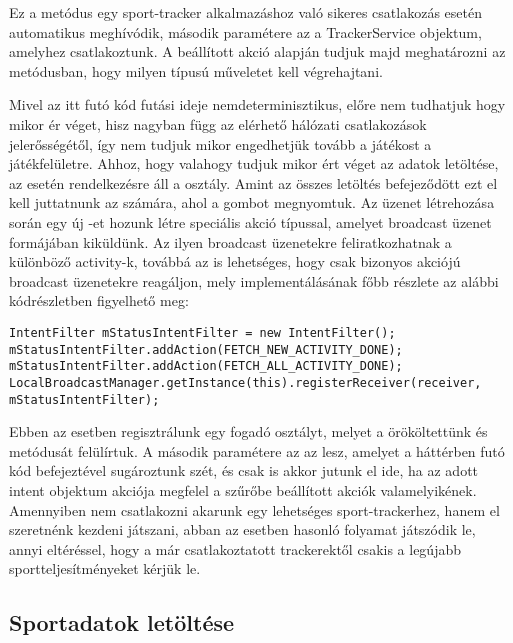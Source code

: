 Ez a metódus egy sport-tracker alkalmazáshoz való sikeres csatlakozás esetén automatikus meghívódik, második paramétere az a TrackerService objektum, amelyhez csatlakoztunk. 
A beállított akció alapján tudjuk majd meghatározni az  metódusban, hogy milyen típusú műveletet kell végrehajtani. 

Mivel az itt futó kód futási ideje nemdeterminisztikus, előre nem tudhatjuk hogy mikor ér véget, hisz nagyban függ az elérhető hálózati csatlakozások jelerősségétől, így nem tudjuk mikor engedhetjük tovább a játékost a játékfelületre. 
Ahhoz, hogy valahogy tudjuk mikor ért véget az adatok letöltése, az  esetén rendelkezésre áll a  osztály. 
Amint az összes letöltés befejeződött ezt el kell juttatnunk az  számára, ahol a gombot megnyomtuk. 
Az üzenet létrehozása során egy új -et hozunk létre speciális akció típussal, amelyet broadcast üzenet formájában kiküldünk. 
Az ilyen broadcast üzenetekre feliratkozhatnak a különböző activity-k, továbbá az is lehetséges, hogy csak bizonyos akciójú broadcast üzenetekre reagáljon, mely implementálásának főbb részlete az alábbi kódrészletben figyelhető meg:

\begin{lstlisting}
IntentFilter mStatusIntentFilter = new IntentFilter();
mStatusIntentFilter.addAction(FETCH_NEW_ACTIVITY_DONE);
mStatusIntentFilter.addAction(FETCH_ALL_ACTIVITY_DONE);
LocalBroadcastManager.getInstance(this).registerReceiver(receiver, mStatusIntentFilter);
\end{lstlisting}

Ebben az esetben regisztrálunk egy fogadó osztályt, melyet a  örököltettünk és  metódusát felülírtuk. 
A második paramétere az az  lesz, amelyet a háttérben futó kód befejeztével sugároztunk szét, és csak is akkor jutunk el ide, ha az adott intent objektum akciója megfelel a szűrőbe beállított akciók valamelyikének. 
Amennyiben nem csatlakozni akarunk egy lehetséges sport-trackerhez, hanem el szeretnénk kezdeni játszani, abban az esetben hasonló folyamat játszódik le, annyi eltéréssel, hogy a már csatlakoztatott trackerektől csakis a legújabb sportteljesítményeket kérjük le. 

\subsection*{Sportadatok letöltése}
\label{trackerconnect}


